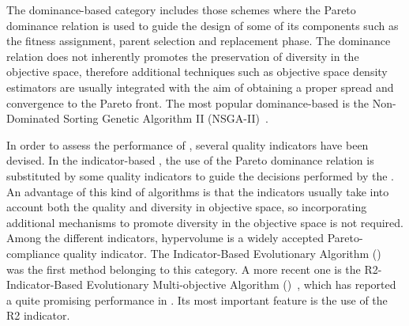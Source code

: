 The dominance-based category includes those schemes where the Pareto dominance relation is used to guide the 
design of some of its components such as the fitness assignment, parent selection and replacement phase.
%
The dominance relation does not inherently promotes the preservation of diversity in the objective space, 
therefore additional techniques such as objective space density estimators are usually integrated with the aim
of obtaining a proper spread and convergence to the Pareto front.
%
%
The most popular dominance-based \MOEA{} is the Non-Dominated Sorting Genetic Algorithm II (NSGA-II)~\cite{Joel:NSGAII}.
%

In order to assess the performance of \MOEAS{}, several quality indicators have been devised.
%
In the indicator-based \MOEAS{}, the use of the Pareto dominance relation is substituted by some quality indicators 
to guide the decisions performed by the \MOEA{}.
%
An advantage of this kind of algorithms is that the indicators usually take into account both the quality and 
diversity in objective space, so incorporating additional mechanisms to promote diversity in the objective 
space is not required.
%
Among the different indicators, hypervolume is a widely accepted Pareto-compliance quality indicator.
%
The Indicator-Based Evolutionary Algorithm (\IBEA{})~\cite{Joel:IBEA} was the first method belonging to this category.
%
A more recent one is the R2-Indicator-Based Evolutionary Multi-objective Algorithm (\RMOEA{})~\cite{trautmann2013r2}, 
which has reported a quite promising performance in \MOPS{}.
%
%
%
Its most important feature is the use of the R2 indicator.
%

